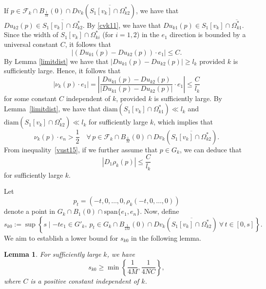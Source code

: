 \documentclass[11pt]{amsart}
\theoremstyle{plain}
\newtheorem{lemma}{Lemma}[section]
\newcommand{\0}{\textbf{0}}
\numberwithin{equation}{section}
\numberwithin{equation}{section}
\numberwithin{figure}{section}
\begin{document}
If \( p \in \mathcal{F}_k\cap B_{\frac{1}{M}}(0) \cap Dv_k(\overline{S_1[v_k]\cap\Omega^*_{k2}}) \), 
we have that \( Du_{k2}(p)\in \overline{S_1[v_k] \cap \Omega^*_{k2}} \).
By \eqref{cvk11}, we have that \( Du_{k1}(p)\in S_1[v_k] \cap \overline{\Omega^*_{k1}} \).
Since the width of \( S_1[v_k] \cap \Omega^*_{ki} \) (for \( i = 1, 2 \)) in the \( e_1 \) direction is bounded by a universal constant \( C \), it follows that \[ \left|\left(Du_{k1}(p) - Du_{k2}(p)\right)\cdot e_1\right|\leq C.\]
By Lemma \ref{limitdist} we have that \( |Du_{k1}(p) - Du_{k2}(p)|\geq l_k \) provided \( k \) is sufficiently large.
Hence, it follows that
\begin{equation}\label{vust15}
  \left| \nu_k(p) \cdot e_1 \right| = \left| \frac{Du_{k1}(p) - Du_{k2}(p)}{|Du_{k1}(p) - Du_{k2}(p)|} \cdot e_1 \right| \leq \frac{C}{l_k}
\end{equation}
for some  constant \( C \) independent of \( k \), provided \( k \) is sufficiently large.
By Lemma~\ref{limitdist}, we have that \(\text{diam}\left(S_1[v_k] \cap \Omega^*_{k1}\right) \ll l_k\) and \(\text{diam}\left(S_1[v_k] \cap \Omega^*_{k2}\right) \ll l_k\) for sufficiently large \(k\), which implies that 
\begin{equation}\label{nukp1}
\nu_k(p) \cdot e_n > \frac{1}{2} \quad \forall\, p \in \mathcal{F}_k \cap B_{\frac{1}{M}}(0) \cap Dv_k(\overline{S_1[v_k] \cap \Omega^*_{k2}}).
\end{equation}
From inequality~\eqref{vust15}, if we further assume that \( p \in G_k \), we can deduce that
\begin{equation}\label{7yue}
  \left| D_1\rho_k(p) \right| \leq \frac{C}{l_k}
\end{equation}
for sufficiently large \( k \).



Let
\[ p_t = (-t, 0, \ldots, 0, \rho_k(-t, 0, \ldots, 0)) \]
denote a point in \( G_k \cap B_1(0) \cap\text{span}\{e_1, e_n\}\).
Now, define
\begin{equation}
s_{k0} := \sup \left\{ s \mid -te_1\in G'_k,\ p_t \in G_k\cap B_{\frac{1}{2M}}(0) \cap Dv_k\left(\overline{S_1[v_k] \cap \Omega^*_{k2}}\right) \ \forall\,t\in[0,s] \right\}.
\end{equation}
We aim to establish a lower bound for $s_{k0}$ in the following lemma.

\begin{lemma}\label{ests}
For sufficiently large \( k \), we have
\begin{equation}\label{dudu}
s_{k0} \geq \min\left\{\frac{1}{4M}, \frac{1}{4NC}\right\},
\end{equation}
where \( C \) is a positive constant independent of \( k \).
\end{lemma}
\end{document}
